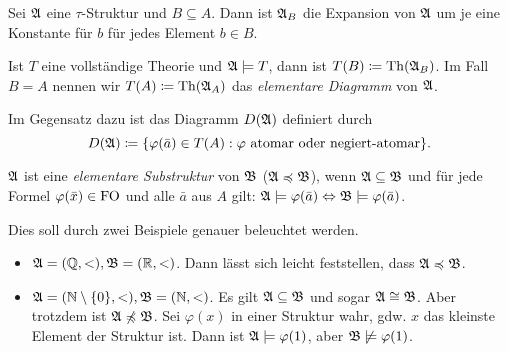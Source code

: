 \begin{definition}
	Sei $\mathfrak{A}$ eine $\tau$-Struktur und $B\subseteq A$. Dann ist $\mathfrak{A}_B$ die Expansion von $\mathfrak{A}$ um je eine Konstante für $b$ für jedes Element $b\in B$. 
\end{definition}

\begin{definition}
	Ist $T$ eine vollständige Theorie und $\mathfrak{A}\models T$, dann ist $T(B)\coloneqq \operatorname{Th}(\mathfrak{A}_B)$. Im Fall $B=A$ nennen wir $T(A)\coloneqq \operatorname{Th}(\mathfrak{A}_A)$ das \textit{elementare Diagramm} von $\mathfrak{A}$.
\end{definition}
Im Gegensatz dazu ist das Diagramm $D(\mathfrak{A})$ definiert durch $$D(\mathfrak{A})\coloneqq\{\varphi(\bar{a})\in T(A) : \varphi \text{ atomar oder negiert-atomar}\}.$$

\begin{definition}
	$\mathfrak{A}$ ist eine \textit{elementare Substruktur} von $\mathfrak{B}$ ($\mathfrak{A}\preccurlyeq\mathfrak{B}$), wenn $\mathfrak{A}\subseteq\mathfrak{B}$ und für jede Formel $\varphi(\bar{x})\in \operatorname{FO}$ und alle $\bar{a}$ aus $A$ gilt: $\mathfrak{A}\models\varphi(\bar{a})\Leftrightarrow\mathfrak{B}\models\varphi(\bar{a})$.
\end{definition}
Dies soll durch zwei Beispiele genauer beleuchtet werden. 

\begin{itemize}
	\item $\mathfrak{A}=(\mathbb{Q},<),\mathfrak{B}=(\mathbb{R},<)$. Dann lässt sich leicht feststellen, dass $\mathfrak{A}\preccurlyeq\mathfrak{B}$.
	\item $\mathfrak{A}=(\mathbb{N}\setminus\{0\},<), \mathfrak{B}=(\mathbb{N},<)$. Es gilt $\mathfrak{A}\subseteq\mathfrak{B}$ und sogar $\mathfrak{A}\cong\mathfrak{B}$. Aber trotzdem ist $\mathfrak{A}\not\preccurlyeq\mathfrak{B}$. Sei $\varphi(x)$ in einer Struktur wahr, gdw. $x$ das kleinste Element der Struktur ist. Dann ist $\mathfrak{A}\models\varphi(1)$, aber $\mathfrak{B}\not\models\varphi(1)$.
\end{itemize}

